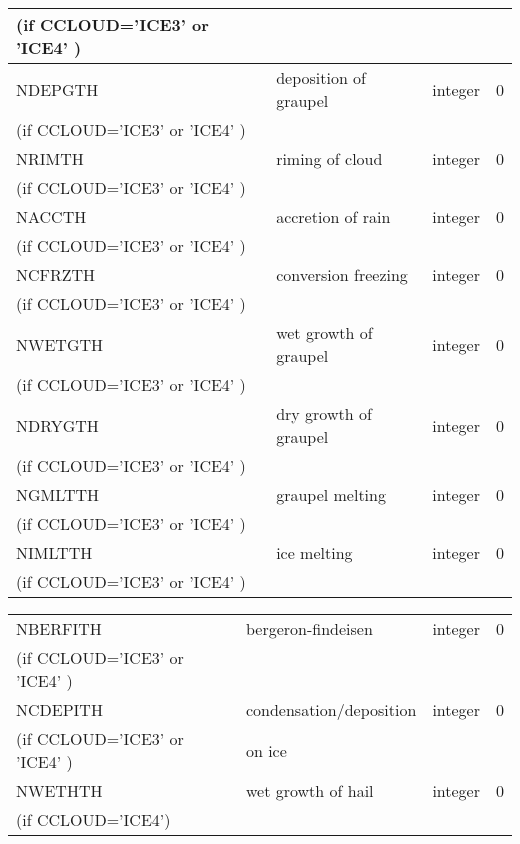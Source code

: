 \begin{center}
\begin{tabular} {|p{8cm}|p{4cm}|>{\centering}p{1.5cm}|p{1.5cm}<{\centering}|}
(if CCLOUD='ICE3' or 'ICE4' ) & &   &  \\\hline
NDEPGTH  & deposition of graupel & integer  &  0 \index{NDEPGTH!\innam{NAM\_BU\_RTH}}\\
(if CCLOUD='ICE3' or 'ICE4' ) & &   &  \\\hline
NRIMTH   & riming of cloud     & integer  &  0 \index{NRIMTH!\innam{NAM\_BU\_RTH}}\\
(if CCLOUD='ICE3' or 'ICE4' ) & &   &  \\\hline
NACCTH   & accretion of rain   & integer  &  0 \index{NACCTH!\innam{NAM\_BU\_RTH}}\\
(if CCLOUD='ICE3' or 'ICE4' ) & &   &  \\\hline
NCFRZTH  & conversion freezing & integer  &  0 \index{NCFRZTH!\innam{NAM\_BU\_RTH}}\\
(if CCLOUD='ICE3' or 'ICE4' ) & &   &  \\\hline
NWETGTH  & wet growth of graupel& integer  &  0 \index{NWETGTH!\innam{NAM\_BU\_RTH}}\\
(if CCLOUD='ICE3' or 'ICE4' ) & &   &  \\\hline
NDRYGTH  & dry growth of graupel& integer  &  0 \index{NDRYGTH!\innam{NAM\_BU\_RTH}}\\
(if CCLOUD='ICE3' or 'ICE4' ) & &   &  \\\hline
NGMLTTH  & graupel melting      & integer  &  0 \index{NGMLTTH!\innam{NAM\_BU\_RTH}}\\
(if CCLOUD='ICE3' or 'ICE4' ) & &   &  \\\hline
NIMLTTH  & ice melting          & integer  &  0 \index{NIMLTTH!\innam{NAM\_BU\_RTH}}\\
(if CCLOUD='ICE3' or 'ICE4' ) & &   &  \\\hline
\end{tabular}
\begin{tabular} {|p{8cm}|p{4cm}|>{\centering}p{1.5cm}|p{1.5cm}<{\centering}|}
\hline
NBERFITH  & bergeron-findeisen   & integer  &  0 \index{NBERFITH!\innam{NAM\_BU\_RTH}}\\
(if CCLOUD='ICE3' or 'ICE4' ) & &   &  \\\hline
NCDEPITH  & condensation/deposition  & integer  &  0 \index{NCDEPITH!\innam{NAM\_BU\_RTH}}\\
(if CCLOUD='ICE3' or 'ICE4' ) & on ice   &  \\\hline
NWETHTH   & wet growth of hail   & integer  &  0 \index{NWETHTH!\innam{NAM\_BU\_RTH}}\\
(if CCLOUD='ICE4')   &  &        &   \\\hline

\end{tabular}
\end{center}
